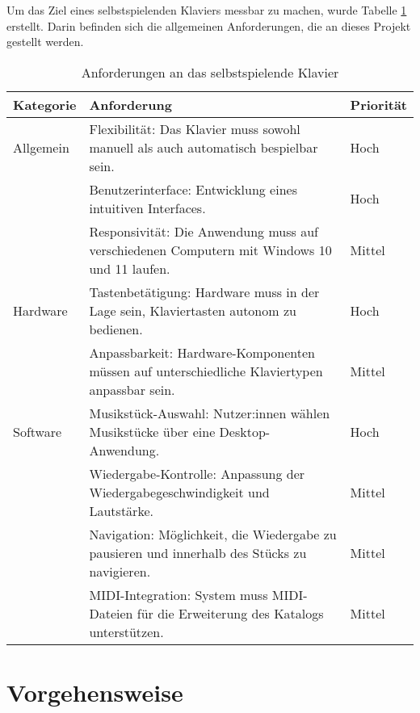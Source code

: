 Um das Ziel eines selbstspielenden Klaviers messbar zu machen, wurde Tabelle \ref{table:anforderungen} erstellt.
Darin befinden sich die allgemeinen Anforderungen, die an dieses Projekt gestellt werden.

\begin{table}[ht]
    \centering
    \begin{tabular}{ | m{2cm} | m{10cm}| m{2cm} | }
        \hline
        \textbf{Kategorie} & \textbf{Anforderung} & \textbf{Priorität} \\
        \hline
        Allgemein & Flexibilität: Das Klavier muss sowohl manuell als auch automatisch bespielbar sein. & Hoch \\
        \cline{2-3}
        & Benutzerinterface: Entwicklung eines intuitiven Interfaces. & Hoch \\
        \cline{2-3}
        & Responsivität: Die Anwendung muss auf verschiedenen Computern mit Windows 10 und 11 laufen. & Mittel \\
        \cline{2-3}
        \hline
        Hardware & Tastenbetätigung: Hardware muss in der Lage sein, Klaviertasten autonom zu bedienen. & Hoch \\
        \cline{2-3}
        & Anpassbarkeit: Hardware-Komponenten müssen auf unterschiedliche Klaviertypen anpassbar sein. & Mittel \\
        \hline
        Software & Musikstück-Auswahl: Nutzer:innen wählen Musikstücke über eine Desktop-Anwendung. & Hoch \\
        \cline{2-3}
        & Wiedergabe-Kontrolle: Anpassung der Wiedergabegeschwindigkeit und Lautstärke. & Mittel \\
        \cline{2-3}
        & Navigation: Möglichkeit, die Wiedergabe zu pausieren und innerhalb des Stücks zu navigieren. & Mittel \\
        \cline{2-3}
        & MIDI-Integration: System muss MIDI-Dateien für die Erweiterung des Katalogs unterstützen. & Mittel \\
        \hline
    \end{tabular}
    \caption{Anforderungen an das selbstspielende Klavier}
    \label{table:anforderungen}
\end{table}


\section{Vorgehensweise} \label{sec:zielstellung-vorgehen}

